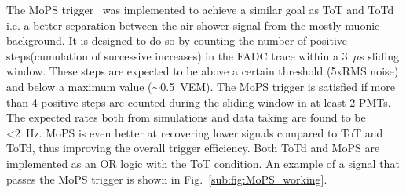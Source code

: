 The MoPS trigger~\cite{gap_note_2011} was implemented to achieve a similar goal as ToT and ToTd i.e. a better separation between the air shower signal from the mostly muonic background. It is designed to do so by counting the number of positive steps(cumulation of successive increases) in the FADC trace within a 3 $\mu$s sliding window. These steps are expected to be above a certain threshold (5xRMS noise) and below a maximum value ($\sim$0.5 VEM). The MoPS trigger is satisfied if more than 4 positive steps are counted during the sliding window in at least 2 PMTs. The expected rates both from simulations and data taking are found to be <2 Hz. MoPS is even better at recovering lower signals compared to ToT and ToTd, thus improving the overall trigger efficiency. Both ToTd and MoPS are implemented as an OR logic with the ToT condition. An example of a signal that passes the MoPS trigger is shown in Fig.~\ref{sub:fig:MoPS_working}.



